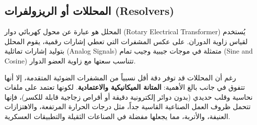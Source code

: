 \subsection{المحللات أو الريزولفرات (\textenglish{Resolvers})}
المحلل هو عبارة عن محول كهربائي دوار (\textenglish{Rotary Electrical Transformer}) يُستخدم لقياس زاوية الدوران. على عكس المشفرات التي تعطي إشارات رقمية، يقوم المحلل بتوليد إشارات تماثلية (\textenglish{Analog Signals}) متمثلة في موجات جيبية وجيب تمام (\textenglish{Sine and Cosine}) تتناسب سعتها مع زاوية العضو الدوار.

رغم أن المحللات قد توفر دقة أقل نسبياً من المشفرات الضوئية المتقدمة، إلا أنها تتفوق في جانب بالغ الأهمية: \textbf{المتانة الميكانيكية والاعتمادية}. لكونها تعتمد على ملفات نحاسية وقلب حديدي (بدون دوائر إلكترونية دقيقة أو أقراص زجاجية قابلة للكسر)، فإنها تتحمل ظروف العمل الصناعية القاسية جداً، مثل درجات الحرارة المرتفعة، والاهتزازات العنيفة، والأتربة، مما يجعلها مفضلة في الصناعات الثقيلة والتطبيقات العسكرية.